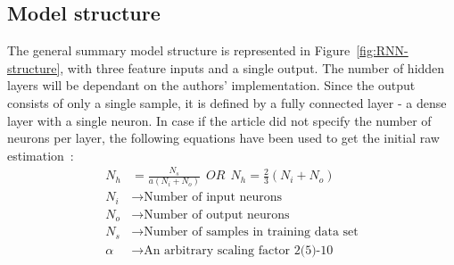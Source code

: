 %
%
\subsection{Model structure} \label{subsec:structure}
The general summary model structure is represented in \mbox{Figure~\ref{fig:RNN-structure}}, with three feature inputs and a single output.
The number of hidden layers will be dependant on the authors' implementation.
Since the output consists of only a single sample, it is defined by a fully connected layer - a dense layer with a single neuron.
In case if the article did not specify the number of neurons per layer, the following equations have been used to get the initial raw estimation~\cite{eckhardt_choosing_2018}:
\begin{equation}
    \begin{split}
        N_h &= \frac{N_s}{ a \left(N_i+N_o \right)} \ \ OR \ \ N_h = \frac{2}{3}\left(N_i+N_o \right) \\
        N_i &\rightarrow \text{Number of input neurons} \\
        N_o &\rightarrow \text{Number of output neurons} \\
        N_s &\rightarrow \text{Number of samples in training data set} \\
        \alpha &\rightarrow \text{An arbitrary scaling factor 2(5)-10}
    \end{split}
\end{equation}


